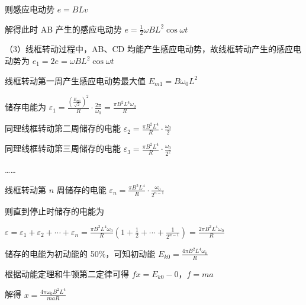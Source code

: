 \documentclass[\gkver]{gaokaozhenti}
\begin{document}
\begin{enumerate}
{则感应电动势 $e = BLv$

解得此时 AB 产生的感应电动势 $e = \frac{1}{2}\omega BL^{2}\cos\omega t$

（3）线框转动过程中，AB、CD 均能产生感应电动势，故线框转动产生的感应电动势为 $e_{1} = 2e = \omega BL^{2}\cos\omega t$

线框转动第一周产生感应电动势最大值 $E_{m1} = B\omega_{0}L^{2}$

储存电能为 $\varepsilon_{1} = \frac{\left(\frac{E_{m1}}{\sqrt{2}}\right)^{2}}{R}\cdot\frac{2\pi}{\omega_{0}} = \frac{\pi B^{2}L^{4}\omega_{0}}{R}$

同理线框转动第二周储存的电能 $\varepsilon_{2} = \frac{\pi B^{2}L^{4}}{R}\cdot\frac{\omega_{0}}{2}$

同理线框转动第三周储存的电能 $\varepsilon_{3} = \frac{\pi B^{2}L^{4}}{R}\cdot\frac{\omega_{0}}{2^{2}}$

……

线框转动第 $n$ 周储存的电能 $\varepsilon_{n} = \frac{\pi B^{2}L^{4}}{R}\cdot\frac{\omega_{0}}{2^{n-1}}$

则直到停止时储存的电能为

$\varepsilon = \varepsilon_{1} + \varepsilon_{2} + \cdots + \varepsilon_{n} = \frac{\pi B^{2}L^{4}\omega_{0}}{R}\left(1 + \frac{1}{2} + \cdots + \frac{1}{2^{n-1}}\right) = \frac{2\pi B^{2}L^{4}\omega_{0}}{R}$

储存的电能为初动能的 50\%，可知初动能 $E_{k0} = \frac{4\pi B^{2}L^{4}\omega_{0}}{R}$

根据动能定理和牛顿第二定律可得 $fx = E_{k0} - 0$，$f = ma$

解得 $x = \frac{4\pi\omega_{0}B^{2}L^{4}}{maR}$
}

\end{enumerate}
\end{document}

